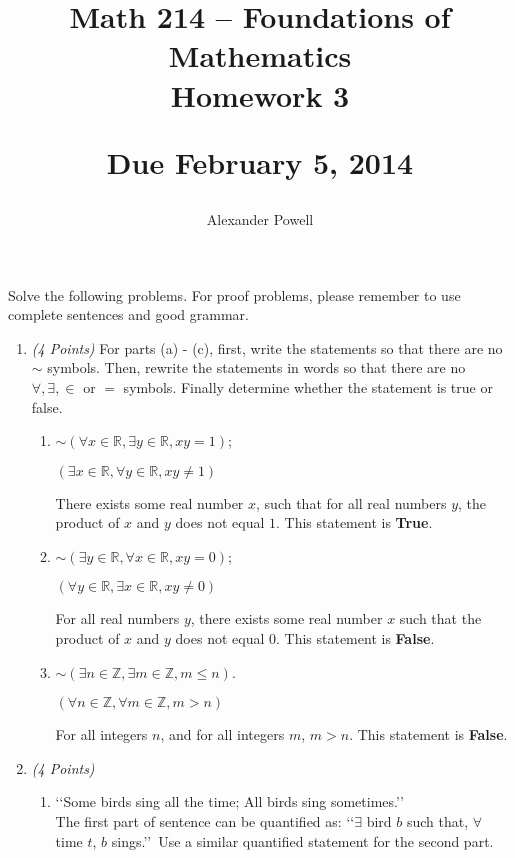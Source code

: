 \documentclass[10pt]{article} %
\title{Math 214 -- Foundations of Mathematics\\
Homework 3\\
\author{Alexander Powell}
{\large{\bf Due February 5, 2014}}}
\date{}
\newcommand{\Z}{\mathbb{Z}}
\newcommand{\R}{\mathbb{R}}
\newcommand{\points}[1]{{\it (#1 Points)}}
\begin{document}
\maketitle

Solve the following problems. For proof problems, please remember to use complete sentences
and good grammar.

\begin{enumerate}
\item \points{4} For parts (a) - (c), first, write the statements so that there are no $\sim$ symbols. Then, rewrite the statements in words so that there are no $\forall, \exists, \in$ or $=$ symbols. Finally determine whether the statement is true or false. 
\begin{enumerate}
\item $\sim(\forall x\in \R, \exists y\in \R, xy=1)$;

\bigskip

 $(\exists x\in \R, \forall y\in \R, xy \neq 1)$

There exists some real number $x$, such that for all real numbers $y$, the product of $x$ and $y$ does not equal $1$.  This statement is {\bf True}.  

\bigskip

\item $\sim(\exists y\in \R, \forall x\in \R, xy=0)$;

\bigskip

 $(\forall y\in \R, \exists x\in \R, xy \neq 0)$

For all real numbers $y$, there exists some real number $x$ such that the product of $x$ and $y$ does not equal $0$.  This statement is {\bf False}.  

\bigskip

\item $\sim(\exists n\in \Z, \exists m\in \Z, m\le n)$.

\bigskip

 $(\forall n\in \Z, \forall m\in \Z, m > n)$

For all integers $n$, and for all integers $m$, $m > n$.  This statement is {\bf False}.  

\bigskip

\end{enumerate}

\item \points{4}\begin{enumerate}
        \item \lq\lq Some birds sing all the time; 	All birds sing sometimes.\rq\rq\\
  The first part of sentence can be  quantified as: \lq\lq $\exists$ bird $b$ such that, $\forall$ time $t$, $b$ sings.\rq\rq\ Use a similar quantified statement for the second part.
  

\end{enumerate}
\end{enumerate}
\end{document}
